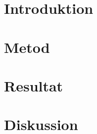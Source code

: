 \documentclass[a4paper, 12pt]{article}
\begin{document}



\tableofcontents
\newpage


\section{Introduktion}


\newpage
\section{Metod}


\newpage
\section{Resultat}


\newpage
\section{Diskussion}


\newpage


\appendix

\end{document}

